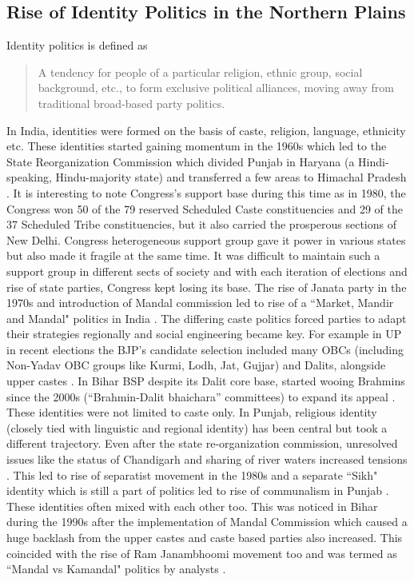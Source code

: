 \begin{sloppypar}
\subsection{Rise of Identity Politics in the Northern Plains}
Identity politics is defined as \begin{quote}
     A tendency for people of a particular religion, ethnic group, social background, etc., to form exclusive political alliances, moving away from traditional broad-based party politics.
 \end{quote}
In India, identities were formed on the basis of caste, religion, language, ethnicity etc. These identities started gaining momentum in the 1960s which led to the State Reorganization Commission which divided Punjab in Haryana (a Hindi-speaking, Hindu-majority state) and transferred a few areas to Himachal Pradesh \citep{Punjab_1966_reorg}. It is interesting to note Congress’s support base during this time as in 1980, the Congress won 50 of the 79 reserved Scheduled Caste constituencies and 29 of the 37 Scheduled Tribe constituencies, but it also carried the prosperous sections of New Delhi. Congress heterogeneous support group gave it power in various states but also made it fragile at the same time. It was difficult to maintain such a support group in different sects of society and with each iteration of elections and rise of state parties, Congress kept losing its base. The rise of Janata party in the 1970s and introduction of Mandal commission led to rise of a ``Market, Mandir and Mandal" politics in India \citep{yadav1999electoral}. The differing caste politics forced parties to adapt their strategies regionally and social engineering became key. For example in UP in recent elections the BJP’s candidate selection  included many OBCs (including Non-Yadav OBC groups like Kurmi, Lodh, Jat, Gujjar) and Dalits, alongside upper castes \citep{jaffrelot2012castes}. In Bihar BSP despite its Dalit core base, started wooing Brahmins since the 2000s (“Brahmin-Dalit bhaichara” committees) to expand its appeal \citep{ankit2018caste}. These identities were not limited to caste only. In Punjab, religious identity (closely tied with linguistic and regional identity) has been central but took a different trajectory. Even after the state re-organization commission,  unresolved issues like the status of Chandigarh and sharing of river waters increased tensions \citep{padhiari2008inter}. This led to rise of separatist movement in the 1980s and a separate ``Sikh" identity which is still a part of politics led to rise of communalism in Punjab \citep{gupta1985communalising}. These identities often mixed with each other too. This was noticed in Bihar during the 1990s after the implementation of Mandal Commission which caused a huge backlash from the upper castes and caste based parties also increased. This coincided with the rise of Ram Janambhoomi movement too and was termed as ``Mandal vs Kamandal" politics by analysts \citep{roy2024politics}. 


\end{sloppypar}
